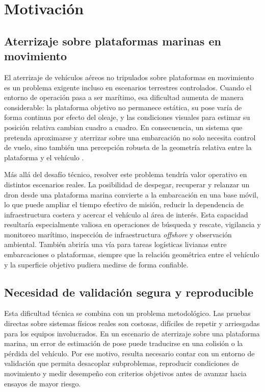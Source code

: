\documentclass[12pt,a4paper]{report}
\begin{document}
\section{Motivación} \label{sec:motivacion}

\subsection{Aterrizaje sobre plataformas marinas en movimiento}

El aterrizaje de vehículos aéreos no tripulados sobre plataformas en movimiento
es un problema exigente incluso en escenarios terrestres controlados. Cuando el
entorno de operación pasa a ser marítimo, esa dificultad aumenta de manera
considerable: la plataforma objetivo no permanece estática, su pose varía de
forma continua por efecto del oleaje, y las condiciones visuales para estimar
su posición relativa cambian cuadro a cuadro. En consecuencia, un sistema que
pretenda aproximarse y aterrizar sobre una embarcación no solo necesita control
de vuelo, sino también una percepción robusta de la geometría relativa entre la
plataforma y el vehículo \citep{Alarcon2019,Delbene2022,Morales2023}.

Más allá del desafío técnico, resolver este problema tendría valor operativo en
distintos escenarios reales. La posibilidad de despegar, recuperar y relanzar
un dron desde una plataforma marina convierte a la embarcación en una base
móvil, lo que puede ampliar el tiempo efectivo de misión, reducir la
dependencia de infraestructura costera y acercar el vehículo al área de
interés. Esta capacidad resultaría especialmente valiosa en operaciones de
búsqueda y rescate, vigilancia y monitoreo marítimo, inspección de
infraestructura \textit{offshore} y observación ambiental. También abriría una
vía para tareas logísticas livianas entre embarcaciones o plataformas, siempre
que la relación geométrica entre el vehículo y la superficie objetivo pudiera
medirse de forma confiable.

\subsection{Necesidad de validación segura y reproducible}

Esta dificultad técnica se combina con un problema metodológico. Las
pruebas directas sobre sistemas físicos reales son costosas, difíciles de
repetir y arriesgadas para los equipos involucrados. En un escenario de aterrizaje sobre
una plataforma marina, un error de estimación de pose puede traducirse en una 
colisión o la pérdida del vehículo. Por ese motivo,
resulta necesario contar con un entorno de validación que permita desacoplar
subproblemas, reproducir condiciones de movimiento y medir desempeño con
criterios objetivos antes de avanzar hacia ensayos de mayor riesgo.
\end{document}

